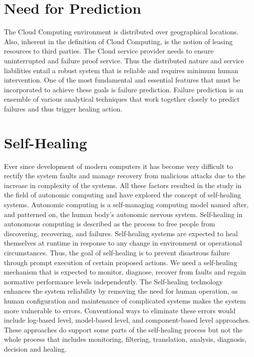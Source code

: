 \section{Need for Prediction}
The Cloud Computing environment is distributed over geographical locations. Also, inherent in the definition of Cloud Computing, is the notion of leasing resources to third parties. The Cloud service provider needs to ensure uninterrupted and failure proof service. Thus the distributed nature and service liabilities entail a robust system that is reliable and requires minimum human intervention. One of the most fundamental and essential features that must be incorporated to achieve these goals is failure prediction. Failure prediction is an ensemble of various analytical techniques that work together closely to predict failures and thus trigger healing action.
\section{Self-Healing}
Ever since development of modern computers it has become very difficult to rectify the system faults and manage recovery from malicious attacks due to the increase in complexity of the systems. All these factors resulted in the study in the field of autonomic computing and have explored the concept of self-healing systems. Autonomic computing is a self-managing computing model named after, and patterned on, the human body's autonomic nervous system. Self-healing in autonomous computing is described as the process to free people from discovering, recovering, and failures.  Self-healing systems are expected to heal themselves at runtime in response to any change in environment or operational circumstances. Thus, the goal of self-healing is to prevent disastrous failure through prompt execution of certain proposed actions. We need a self-healing mechanism that is expected to monitor, diagnose, recover from faults and regain normative performance levels independently. The Self-healing technology enhances the system reliability by removing the need for human operation, as human configuration and maintenance of complicated systems makes the system more vulnerable to errors.  Conventional ways to eliminate these errors would include log-based level, model-based level, and component-based level approaches. These approaches do support some parts of the self-healing process but not the whole process that includes monitoring, filtering, translation, analysis, diagnosis, decision and healing.

